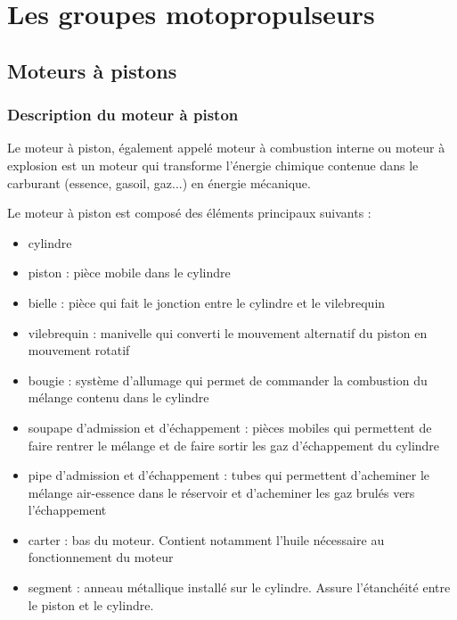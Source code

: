 

\section{Les groupes motopropulseurs}

	\subsection{Moteurs à pistons}
		\subsubsection{Description du moteur à piston}
		Le moteur à piston, également appelé moteur à combustion interne ou moteur à explosion est un moteur qui transforme l'énergie chimique contenue dans le carburant (essence, gasoil, gaz...) en énergie mécanique.
		\begin{figure}[H]
  		\centering
		\end{figure}
		
		Le moteur à piston est composé des éléments principaux suivants :
		\begin{itemize}
			\item cylindre
			\item piston : pièce mobile dans le cylindre
			\item bielle : pièce qui fait le jonction entre le cylindre et le vilebrequin
			\item vilebrequin : manivelle qui converti le mouvement alternatif du piston en mouvement rotatif
			\item bougie : système d'allumage qui permet de commander la combustion du mélange contenu dans le cylindre
			\item soupape d'admission et d'échappement : pièces mobiles qui permettent de faire rentrer le mélange et de faire sortir les gaz d'échappement du cylindre 
			\item pipe d'admission et d'échappement : tubes qui permettent d'acheminer le mélange air-essence dans le réservoir et d'acheminer les gaz brulés vers l'échappement
			\item carter : bas du moteur. Contient notamment l'huile nécessaire au fonctionnement du moteur
			\item segment : anneau métallique installé sur le cylindre. Assure l'étanchéité entre le piston et le cylindre.
		\end{itemize}
	
